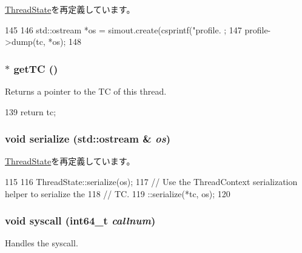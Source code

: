 \hyperlink{structThreadState_a13fa12d1779a94a1e0b968946a1367c7}{ThreadState}を再定義しています。


\begin{DoxyCode}
145     {
146         std::ostream *os = simout.create(csprintf("profile.%
      ;
147         profile->dump(tc, *os);
148     }
\end{DoxyCode}
\hypertarget{structO3ThreadState_a81894d15db5190d5364449a4915b76f5}{
\subsubsection[{getTC}]{$\ast$ getTC ()}}
\label{structO3ThreadState_a81894d15db5190d5364449a4915b76f5}
Returns a pointer to the TC of this thread. 


\begin{DoxyCode}
139 { return tc; }
\end{DoxyCode}
\hypertarget{structO3ThreadState_a53e036786d17361be4c7320d39c99b84}{
\subsubsection[{serialize}]{\setlength{\rightskip}{0pt plus 5cm}void serialize (std::ostream \& {\em os})}}
\label{structO3ThreadState_a53e036786d17361be4c7320d39c99b84}


\hyperlink{structThreadState_a53e036786d17361be4c7320d39c99b84}{ThreadState}を再定義しています。


\begin{DoxyCode}
115     {
116         ThreadState::serialize(os);
117         // Use the ThreadContext serialization helper to serialize the
118         // TC.
119         ::serialize(*tc, os);
120     }
\end{DoxyCode}
\hypertarget{structO3ThreadState_a36e0b96120fcbbc2ee8699158f7be5c2}{
\subsubsection[{syscall}]{\setlength{\rightskip}{0pt plus 5cm}void syscall (int64\_\-t {\em callnum})}}
\label{structO3ThreadState_a36e0b96120fcbbc2ee8699158f7be5c2}
Handles the syscall. 


